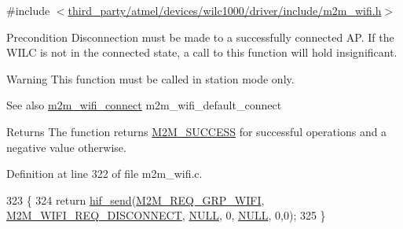 {\ttfamily \#include $<$\hyperlink{m2m__wifi_8h}{third\+\_\+party/atmel/devices/wilc1000/driver/include/m2m\+\_\+wifi.\+h}$>$}

\begin{DoxyPrecond}{Precondition}
Disconnection must be made to a successfully connected AP. If the W\+I\+LC is not in the connected state, a call to this function will hold insignificant.
\end{DoxyPrecond}
\begin{DoxyWarning}{Warning}
This function must be called in station mode only.
\end{DoxyWarning}
\begin{DoxySeeAlso}{See also}
\hyperlink{group__WifiConnectFn_ga19c9871147efe70f5d9c2cc2cdd5bff0}{m2m\+\_\+wifi\+\_\+connect} m2m\+\_\+wifi\+\_\+default\+\_\+connect
\end{DoxySeeAlso}
\begin{DoxyReturn}{Returns}
The function returns \hyperlink{nm__common_8h_a9ef27ba27aafdd1aa3a79d3ba2c36b8f}{M2\+M\+\_\+\+S\+U\+C\+C\+E\+SS} for successful operations and a negative value otherwise. 
\end{DoxyReturn}


Definition at line 322 of file m2m\+\_\+wifi.\+c.


\begin{DoxyCode}
323 \{
324     \textcolor{keywordflow}{return} \hyperlink{m2m__hif_8c_a13ba8ad11b2ac39516ca787386d16ce0}{hif\_send}(\hyperlink{nm__common_8h_a9ab02eb1aea02a75c3f5aade4eef1276aeb9a7d57324ba4b8a6c2a5f46dd499c2}{M2M\_REQ\_GRP\_WIFI}, 
      \hyperlink{group__WlanEnums_gga064de09dec1d5e88ed8d075fa40f57dea929aa54b372a97076010249cc4e139b8}{M2M\_WIFI\_REQ\_DISCONNECT}, \hyperlink{group__BSPDefine_ga070d2ce7b6bb7e5c05602aa8c308d0c4}{NULL}, 0, \hyperlink{group__BSPDefine_ga070d2ce7b6bb7e5c05602aa8c308d0c4}{NULL}, 0,0);
325 \}
\end{DoxyCode}
